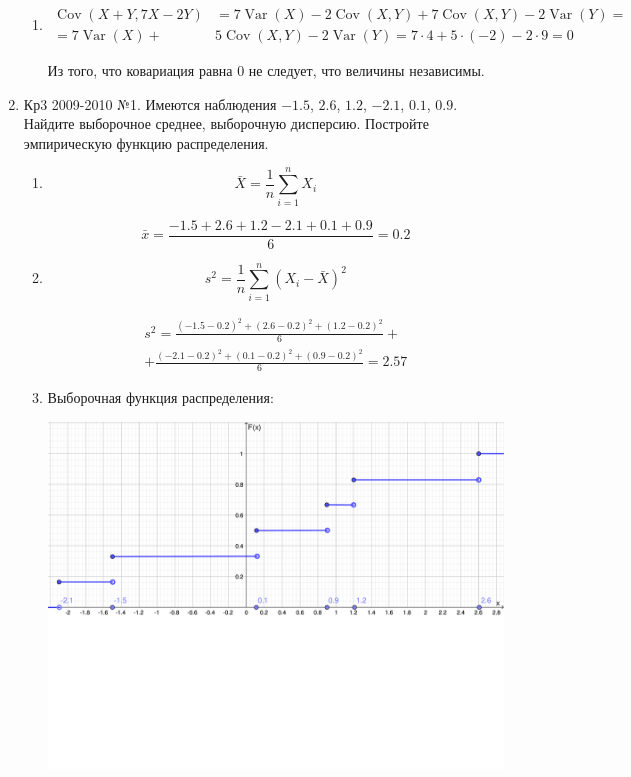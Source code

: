 \documentclass[a4paper,11pt]{article}
\DeclareMathOperator{\Var}{Var}
\DeclareMathOperator{\Cov}{Cov}
\begin{document}
\begin{enumerate}
\begin{enumerate}
\item
\begin{align*}
\Cov(X + Y, 7X - 2Y) &= 7\Var(X) - 2\Cov(X,Y) + 7\Cov(X,Y) - 2\Var(Y) = \\
= 7\Var(X) + &5\Cov(X,Y) - 2\Var(Y) = 7 \cdot 4 + 5 \cdot (-2) -2 \cdot 9 = 0
\end{align*}

Из того, что ковариация равна 0 не следует, что величины независимы. 
\end{enumerate}

\item \label{Кр3 2009-2010 №1} Кр3 2009-2010 №1. Имеются наблюдения $-1.5$, $2.6$, $1.2$, $-2.1$, $0.1$, $0.9$. Найдите выборочное среднее, выборочную дисперсию. Постройте эмпирическую функцию распределения.
\begin{enumerate}
\item
\[
\bar X = \frac{1}{n} \sum_{i=1}^n X_i
\]

\[
\bar x = \frac{-1.5 + 2.6 + 1.2 - 2.1 + 0.1 + 0.9}{6} = 0.2
\]

\item

\[
s^2 = \frac{1}{n} \sum_{i=1}^n (X_i - \bar X)^2
\]

\begin{align*}
s^2 = \frac{(-1.5 - 0.2)^2 + (2.6 - 0.2)^2 + (1.2 - 0.2)^2}{6} + \\
+ \frac{(-2.1 - 0.2)^2 + (0.1 - 0.2)^2 + (0.9 - 0.2)^2}{6} = 2.57
\end{align*}

\item
Выборочная функция распределения:

\includegraphics[scale=0.3]{func.pdf}
\end{enumerate}


\end{enumerate}
\end{document}
